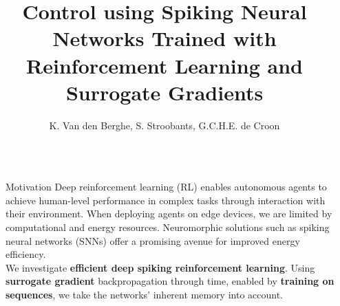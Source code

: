 \documentclass[final,35pt]{beamer}
\title{Control using Spiking Neural Networks Trained with Reinforcement Learning and Surrogate Gradients}
\author{K. Van den Berghe, S. Stroobants, G.C.H.E. de Croon}
\institute[shortinst]{Delft University of Technology}
\newlength{\sepwidth}
\newlength{\colwidth}
\newcommand{\separatorcolumn}{\begin{column}{\sepwidth}\end{column}}
\begin{document}
\begin{frame}
\begin{columns}[t]
\separatorcolumn

\begin{column}{\colwidth}

\begin{block}{{\fontsize{48}{24}\selectfont Motivation}}
{
Deep reinforcement learning (RL) enables autonomous agents to achieve human-level performance in complex tasks through interaction with their environment. When deploying agents on edge devices, we are limited by computational and energy resources. Neuromorphic solutions such as spiking neural networks (SNNs) offer a promising avenue for improved energy efficiency.\\
}
\vspace{1cm}
{
We investigate \textbf{efficient deep spiking reinforcement learning}. Using \textbf{surrogate gradient} backpropagation through time, enabled by \textbf{training on sequences}, we take the networks' inherent memory into account. 
}
\end{block}
\end{column}
\end{columns}
\end{frame}
\end{document}
